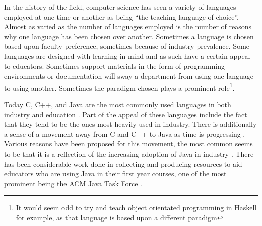 In the history of the field, computer science has seen a variety of languages employed at one time or another as being ``the teaching language of choice''.  Almost as varied as the number of languages employed is the number of reasons why one language has been chosen over another.  Sometimes a language is chosen based upon faculty preference, sometimes because of industry prevalence.  Some languages are designed with learning in mind and as such have a certain appeal to educators.  Sometimes support materials in the form of programming environments or documentation will sway a department from using one language to using another.  Sometimes the paradigm chosen plays a prominent role\footnote{It would seem odd to try and teach object orientated programming in Haskell for example, as that language is based upon a different paradigm}.

Today C, C++, and Java are the most commonly used languages in both industry and education \cite{Pears07}.  Part of the appeal of these languages include the fact that they tend to be the ones most heavily used in industry.  There is additionally a sense of a movement away from C and C++ to Java as time is progressing \cite{Benander04,Bruce05}.  Various reasons have been proposed for this movement, the most common seems to be that it is a reflection of the increasing adoption of Java in industry \cite{Benander04}.  There has been considerable work done in collecting and producing resources to aid educators who are using Java in their first year courses, one of the most prominent being the ACM Java Task Force \cite{Roberts05}.

